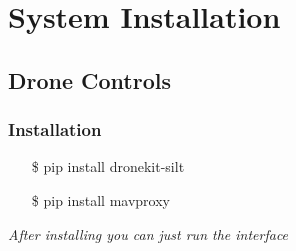 \chapter{System Installation}
\section{Drone Controls}
\subsection{Installation}
    \begin{itemize}
        \item [\$] pip install dronekit-silt
        \item [\$] pip install mavproxy
    \end{itemize}

    \textit{After installing you can just run the interface}